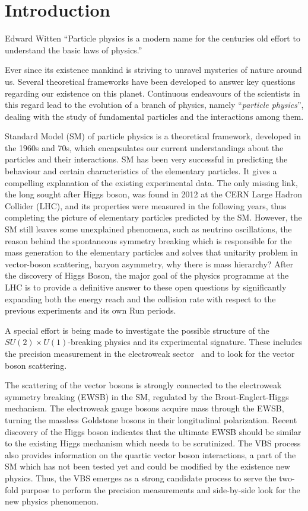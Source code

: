 \chapter{Introduction}
\begin{chapquote}
{Edward Witten}
``Particle physics is a modern name for the centuries old effort to understand the basic laws of physics.''
\end{chapquote}
Ever since its existence mankind is striving to unravel mysteries of nature around us. Several theoretical frameworks have been developed to answer key questions regarding our existence on this planet.  Continuous endeavours of the scientists in this regard lead to the evolution of a branch of physics, namely ``\textit{particle physics}'', dealing with the study of fundamental particles and the interactions among them. 

Standard Model (SM) of particle physics is a theoretical framework, developed in the 1960s and 70s, which encapsulates our current understandings about the particles and their interactions.
SM has been very successful in predicting the behaviour and certain characteristics of the elementary particles. It gives a compelling explanation of the existing experimental data.
The only missing link, the long sought after Higgs boson, was found in 2012 at the CERN Large Hadron Collider (LHC), and its properties were measured in the following years, thus completing the picture of elementary particles predicted by the SM.
However, the SM still leaves some unexplained phenomena, such as neutrino oscillations, the reason behind the spontaneous symmetry breaking which is responsible for the mass generation to the elementary particles and solves that unitarity problem in vector-boson scattering, baryon asymmetry, why there is mass hierarchy?
After the discovery of Higgs Boson, the major goal of the physics programme at the LHC is to provide a definitive answer to these open questions by significantly expanding both the energy reach and the collision rate with respect to 
the previous experiments and its own Run periods.


A special effort is being made to investigate the possible structure of the $SU(2)\times U(1)$-breaking physics and its experimental signature. These includes the precision measurement in the electroweak sector~\cite{Baak2013} and to look for the vector boson scattering.

The scattering of the vector bosons is strongly connected to the electroweak symmetry breaking (EWSB) in the SM, regulated by the Brout-Englert-Higgs mechanism.
The electroweak gauge bosons acquire mass through the EWSB, turning the massless Goldstone bosons in their longitudinal polarization.
Recent discovery of the Higgs boson indicates that the ultimate EWSB should be similar to the existing Higgs mechanism which needs to be scrutinized.
The VBS process also provides information on the quartic vector boson interactions, a part of the SM which has not been tested yet and could be modified by the existence new physics.
Thus, the VBS  emerges as a strong candidate process to serve the two-fold purpose to perform the precision measurements and side-by-side look for the new physics phenomenon.  


